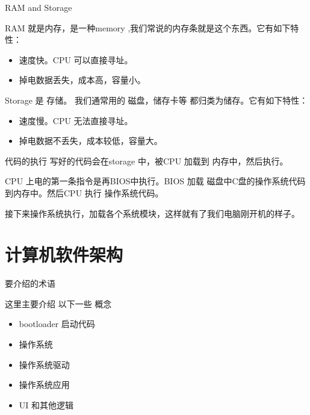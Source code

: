\documentclass[10pt]{beamer}
\begin{document}
\begin{frame}[fragile]{RAM and Storage }

RAM 就是内存，是一种memory ,我们常说的内存条就是这个东西。它有如下特性：
\begin{itemize}
\item 速度快。CPU 可以直接寻址。
\item 掉电数据丢失，成本高，容量小。
\end{itemize}

Storage 是 存储。 我们通常用的 磁盘，储存卡等 都归类为储存。它有如下特性：
\begin{itemize}
\item 速度慢。CPU 无法直接寻址。
\item 掉电数据不丢失，成本较低，容量大。
\end{itemize}

\end{frame}



\begin{frame}[fragile]{代码的执行}
写好的代码会在storage 中，被CPU 加载到 内存中，然后执行。

CPU 上电的第一条指令是再BIOS中执行。BIOS 加载 磁盘中C盘的操作系统代码到内存中。然后CPU 执行
操作系统代码。

接下来操作系统执行，加载各个系统模块，这样就有了我们电脑刚开机的样子。


\end{frame}



\section{计算机软件架构}

\begin{frame}[fragile]{要介绍的术语}

这里主要介绍 以下一些 概念
\begin{itemize}
\item bootloader 启动代码
\item 操作系统
\item 操作系统驱动
\item 操作系统应用
\item UI 和其他逻辑
\end{itemize}

\end{frame}
\end{document}
